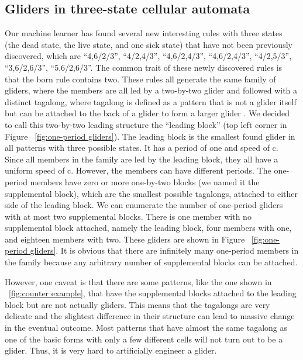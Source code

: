 \documentclass[12pt]{article}
\numberwithin{figure}{section} %
\begin{document}
\subsection{Gliders in three-state cellular automata}
Our machine learner has found several new interesting rules with three states (the dead state, the live state, and one sick state) that have not been previously discovered, which are “4,6/2/3”, “4/2,4/3”, “4,6/2,4/3”, “4,6/2,4/3”, “4/2,5/3”, “3,6/2,6/3”, “5,6/2,6/3”. The common trait of these newly discovered rules is that the born rule contains two. These rules all generate the same family of gliders, where the members are all led by a two-by-two glider and followed with a distinct tagalong, where tagalong is defined as a pattern that is not a glider itself but can be attached to the back of a glider to form a larger glider \cite{spaceship}. We decided to call this two-by-two leading structure the “leading block” (top left corner in Figure ~\ref{fig:one-period gliders}). The leading block is the smallest found glider in all patterns with three possible states. It has a period of one and speed of c. Since all members in the family are led by the leading block, they all have a uniform speed of c. However, the members can have different periods. The one-period members have zero or more one-by-two blocks (we named it the supplemental block), which are the smallest possible tagalongs, attached to either side of the leading block. We can enumerate the number of one-period gliders with at most two supplemental blocks. There is one member with no supplemental block attached, namely the leading block, four members with one, and eighteen members with two. These gliders are shown in Figure ~\ref{fig:one-period gliders}. It is obvious that there are infinitely many one-period members in the family because any arbitrary number of supplemental blocks can be attached. 

However, one caveat is that there are some patterns, like the one shown in ~\ref{fig:counter example}, that have the supplemental blocks attached to the leading block but are not actually gliders. This means that the tagalongs are very delicate and the slightest difference in their structure can lead to massive change in the eventual outcome. Most patterns that have almost the same tagalong as one of the basic forms with only a few different cells will not turn out to be a glider. Thus, it is very hard to artificially engineer a glider.
\end{document}

